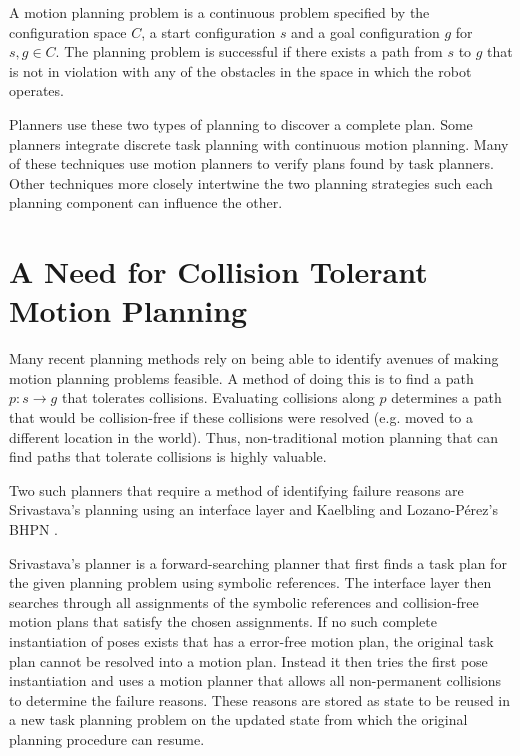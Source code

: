 A motion planning problem is a continuous problem specified by the configuration space $C$, a start configuration $s$ and a goal configuration $g$ for $s,g \in C$. The planning problem is successful if there exists a path from $s$ to $g$ that is not in violation with any of the obstacles in the space in which the robot operates.  

Planners use these two types of planning to discover a complete plan. Some planners integrate discrete task planning with continuous motion planning. Many of these techniques use motion planners to verify plans found by task planners. Other techniques more closely intertwine the two planning strategies such each planning component can influence the other. 

\section{A Need for Collision Tolerant Motion Planning} \label{intro:collisiontolerant}
Many recent planning methods rely on being able to identify avenues of making motion planning problems feasible. A method of doing this is to find a path $p:s \rightarrow g$ that tolerates collisions. Evaluating collisions along $p$ determines a path that would be collision-free if these collisions were resolved (e.g. moved to a different location in the world). Thus, non-traditional motion planning that can find paths that tolerate collisions is highly valuable. 

Two such planners that require a method of identifying failure reasons are Srivastava's planning using an interface layer and Kaelbling and Lozano-P\'{e}rez's BHPN  . 

Srivastava's planner is a forward-searching planner that first finds a task plan for the given planning problem using symbolic references. The interface layer then searches through all assignments of the symbolic references and collision-free motion plans that satisfy the chosen assignments. If no such complete instantiation of poses exists that has a error-free motion plan, the original task plan cannot be resolved into a motion plan. Instead it then tries the first pose instantiation and uses a motion planner that allows all non-permanent collisions to determine the failure reasons. These reasons are stored as state to be reused in a new task planning problem on the updated state from which the original planning procedure can resume. 

